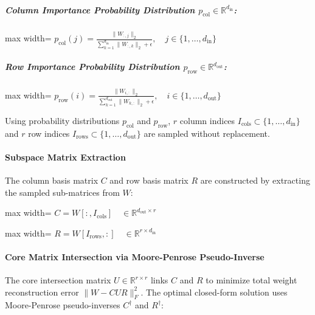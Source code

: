 \subparagraph{Column Importance Probability Distribution $p_{\text{col}} \in \mathbb{R}^{d_{\text{in}}}$:}
\begin{center}
\begin{adjustbox}{max width=\columnwidth}
$\displaystyle
p_{\text{col}}(j) = \frac{\|W_{:, j}\|_2}{\sum_{k=1}^{d_{\text{in}}} \|W_{:, k}\|_2 + \epsilon}, \quad j \in \{1, \dots, d_{\text{in}}\}
$
\end{adjustbox}
\end{center}

\subparagraph{Row Importance Probability Distribution $p_{\text{row}} \in \mathbb{R}^{d_{\text{out}}}$:}
\begin{center}
\begin{adjustbox}{max width=\columnwidth}
$\displaystyle
p_{\text{row}}(i) = \frac{\|W_{i, :}\|_2}{\sum_{k=1}^{d_{\text{out}}} \|W_{k, :}\|_2 + \epsilon}, \quad i \in \{1, \dots, d_{\text{out}}\}
$
\end{adjustbox}
\end{center}

Using probability distributions $p_{\text{col}}$ and $p_{\text{row}}$, $r$ column indices $I_{\text{cols}} \subset \{1, \dots, d_{\text{in}}\}$ and $r$ row indices $I_{\text{rows}} \subset \{1, \dots, d_{\text{out}}\}$ are sampled without replacement.

\paragraph{Subspace Matrix Extraction}
The column basis matrix $C$ and row basis matrix $R$ are constructed by extracting the sampled sub-matrices from $W$:

\begin{center}
\begin{adjustbox}{max width=\columnwidth}
$\displaystyle
C = W[:, I_{\text{cols}}] \quad \in \mathbb{R}^{d_{\text{out}} \times r}
$
\end{adjustbox}
\end{center}

\begin{center}
\begin{adjustbox}{max width=\columnwidth}
$\displaystyle
R = W[I_{\text{rows}}, :] \quad \in \mathbb{R}^{r \times d_{\text{in}}}
$
\end{adjustbox}
\end{center}

\paragraph{Core Matrix Intersection via Moore-Penrose Pseudo-Inverse}
The core intersection matrix $U \in \mathbb{R}^{r \times r}$ links $C$ and $R$ to minimize total weight reconstruction error $\|W - C U R\|_F^2$. The optimal closed-form solution uses Moore-Penrose pseudo-inverses $C^\dagger$ and $R^\dagger$:

